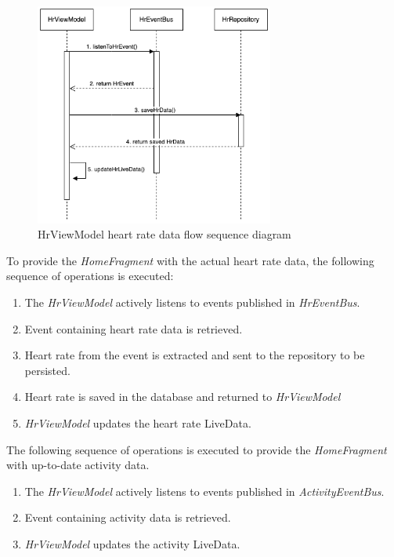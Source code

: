 \begin{figure}[H]
    \centering
    \includegraphics[width=0.7\textwidth]{diagrams/hrviewmodel-hr.drawio.png}
    \caption{HrViewModel heart rate data flow sequence diagram}
    \label{fig:hrviewmodel_hrdata}
\end{figure}

To provide the \emph{HomeFragment} with the actual heart rate data, the following sequence of operations is executed:
\begin{enumerate}
    \item The \emph{HrViewModel} actively listens to events published in \emph{HrEventBus}.
    \item Event containing heart rate data is retrieved.
    \item Heart rate from the event is extracted and sent to the repository to be persisted.
    \item Heart rate is saved in the database and returned to \emph{HrViewModel}
    \item \emph{HrViewModel} updates the heart rate LiveData.
\end{enumerate}

The following sequence of operations is executed to provide the \emph{HomeFragment} with up-to-date activity data.
\begin{enumerate}
    \item The \emph{HrViewModel} actively listens to events published in \emph{ActivityEventBus}.
    \item Event containing activity data is retrieved.
    \item \emph{HrViewModel} updates the activity LiveData.
\end{enumerate}

